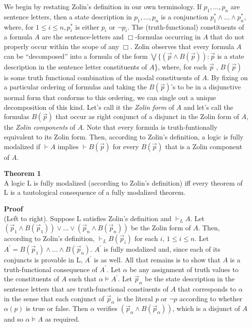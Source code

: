 \documentclass[
  11pt,
  letterpaper,
  DIV=11,
  numbers=noendperiod,
  twoside]{scrartcl}
\begin{document}
We begin by restating Zolin's definition in our own terminology. If
\(p_1,{\ldots},p_n\) are sentence letters, then a state description in
\({p_1,{\ldots},p_n}\) is a conjunction
\(p_1^*\wedge {\ldots}\wedge p_n^*\), where, for \(1\le i\le n, p_i^*\)
is either \(p_i\) or \(\neg p_i\). The (truth-functional) constituents
of a formula \(A\) are the sentence-letters and \(\Box\)-formulas
occurring in \(A\) that do not properly occur within the scope of any
\(\Box\). Zolin observes that every formula \(A\) can be ``decomposed''
into a formula of the form
\({\bigvee}\{(\vec{p}\wedge B(\vec{p}))\!:\vec{p}\) is a state
description in the sentence letter constituents of \(A\)\}, where, for
each \(\vec{p}\) , \(B(\vec{p})\) is some truth functional combination
of the modal constituents of \(A\). By fixing on a particular ordering
of formulas and taking the \(B(\vec{p})\)'s to be in a disjunctive
normal form that conforms to this ordering, we can single out a unique
decomposition of this kind. Let's call it the \emph{Zolin form} of \(A\)
and let's call the formulas \(B(\vec{p})\) that occur as right conjunct
of a disjunct in the Zolin form of \(A\), the \emph{Zolin components} of
\(A\). Note that every formula is truth-funtionally equivalent to its
Zolin form. Then, according to Zolin's definition, a logic is fully
modalized if \(\vdash A\) implies \(\vdash B(\vec{p})\) for every
\(B(\vec{p})\) that is a Zolin component of \(A\).

\textbf{Theorem 1}\\
A logic L is fully modalized (according to Zolin's definition) iff every
theorem of L is a tautological consequence of a fully modalized theorem.

\textbf{Proof}\\
(Left to right). Suppose L satisfies Zolin's definition and
\(\vdash_L A\). Let
\((\vec{p}_1\wedge B(\vec{p}_1))\vee {\ldots}\vee (\vec{p}_n\wedge B(\vec{p}_n))\)
be the Zolin form of \(A\). Then, according to Zolin's definition,
\(\vdash_L B(\vec{p}_i)\) for each \(i\), \(1\le i\le n\). Let
\(A^\prime = B(\vec{p}_1)\wedge {\ldots}\wedge B(\vec{p}_n)\).
\(A^\prime\) is fully modalized and, since each of its conjuncts is
provable in L, \(A^\prime\) is as well. All that remains is to show that
\(A\) is a truth-functional consequence of \(A^\prime\). Let \(\alpha\)
be any assignment of truth values to the constituents of \(A\) such that
\(\alpha\models A^\prime\). Let \(\vec{p}_\alpha\) be the state
description in the sentence letters that are truth-functional
constiuents of \(A\) that corresponds to \(\alpha\) in the sense that
each conjunct of \(\vec{p}_\alpha\) is the literal \emph{p} or
\(\neg p\) according to whether \(\alpha(p)\) is true or false. Then
\(\alpha\) verifies \((\vec{p}_\alpha \wedge B(\vec{p}_\alpha))\), which
is a disjunct of \(A\) and so \(\alpha\models A\) as required.
\end{document}
